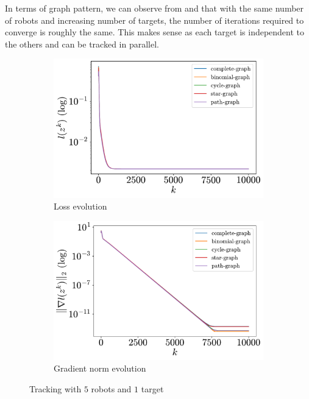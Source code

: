 \documentclass[a4paper,11pt,oneside]{book}
\begin{document}
In terms of graph pattern, we can observe from  and  that with the same number of robots and increasing number of targets, the number of iterations required to converge is roughly the same. This makes sense as each target is independent to the others and can be tracked in parallel.

\begin{figure}[H]
      \centering
      \begin{subfigure}[t]{0.46\linewidth}
            \centering
            \includegraphics[width=\linewidth]{./figs/tracking/5_1_2/loss.pdf} 
            \caption{Loss evolution}
      \end{subfigure}
      \hfill
      \begin{subfigure}[t]{0.46\linewidth}
            \centering
            \includegraphics[width=\linewidth]{./figs/tracking/5_1_2/gradient.pdf} 
            \caption{Gradient norm evolution}
      \end{subfigure}
      \caption{Tracking with $5$ robots and $1$ target}
      \label{fig:tracking_5_1}
\end{figure}
\end{document}
